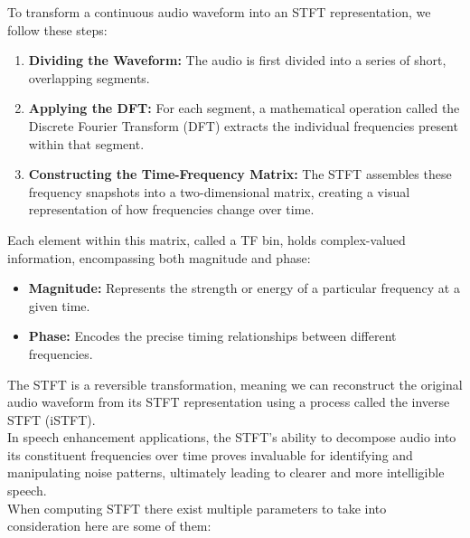 To transform a continuous audio waveform into an STFT representation, we follow these steps:
\begin{enumerate}
    \item \textbf{Dividing the Waveform:} The audio is first divided into a series of short, overlapping segments.
    \item \textbf{Applying the DFT:} For each segment, a mathematical operation called the Discrete Fourier Transform (DFT) extracts the individual frequencies present within that segment.
    \item \textbf{Constructing the Time-Frequency Matrix:} The STFT assembles these frequency snapshots into a two-dimensional matrix, creating a visual representation of how frequencies change over time.
\end{enumerate}
Each element within this matrix, called a TF bin, holds complex-valued information, encompassing both magnitude and phase:
\begin{itemize}
    \item \textbf{Magnitude:} Represents the strength or energy of a particular frequency at a given time.
    \item \textbf{Phase:} Encodes the precise timing relationships between different frequencies.
\end{itemize}
The STFT is a reversible transformation, meaning we can reconstruct the original audio waveform from its STFT representation using a process called the inverse STFT (iSTFT).\\
In speech enhancement applications, the STFT's ability to decompose audio into its constituent frequencies over time proves invaluable for identifying and manipulating noise patterns, ultimately leading to clearer and more intelligible speech.\\
When computing STFT there exist multiple parameters to take into consideration here are some of them:
